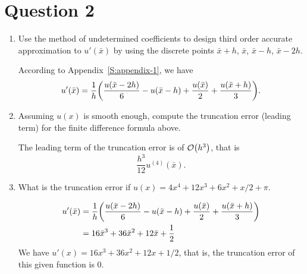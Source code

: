 \section{Question 2}
\begin{enumerate}[label=(\alph*)]
    \item Use the method of undetermined coefficients to design third order accurate approximation to $u'(\bar{x})$ by using the discrete points $\bar{x}+h$, $\bar{x}$, $\bar{x}-h$, $\bar{x}-2h$.
        \begin{solution}{}{}
            According to Appendix~\ref{S:appendix-1}, we have
            \[
                u'(\bar{x}) = \frac{1}{h}\qty(\frac{u(\bar{x}-2h)}{6}-u(\bar{x}-h)+\frac{u(\bar{x})}{2}+\frac{u(\bar{x}+h)}{3}).
            \]
        \end{solution}
    \item Assuming $u(x)$ is smooth enough, compute the truncation error (leading term) for the finite difference formula above.
        \begin{solution}{}{}
            The leading term of the truncation error is of $\order{h^3}$, that is
            \[
                \frac{h^3}{12}u^{(4)}(\bar{x}).
            \]
        \end{solution}
    \item What is the truncation error if $u(x) = 4x^4 + 12x^3 + 6x^2 + x/2 + \pi$.
        \begin{solution}{}{}
            \begin{align*}
                u'(\bar{x}) &= \frac{1}{h}\qty(\frac{u(\bar{x}-2h)}{6}-u(\bar{x}-h)+\frac{u(\bar{x})}{2}+\frac{u(\bar{x}+h)}{3}) \\
                &= 16\bar{x}^3 + 36\bar{x}^2 + 12\bar{x} + \frac{1}{2}
            \end{align*}
            We have $u'(x)=16x^3 + 36x^2 + 12x + 1/2$, that is, the truncation error of this given function is $0$.
        \end{solution}
\end{enumerate}



